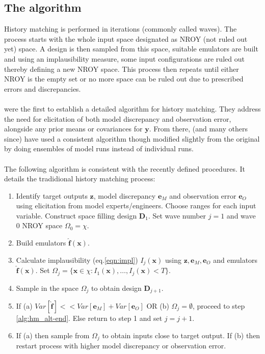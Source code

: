 \documentclass{article}
\newcommand{\emulator}{\hat{f}}
\newcommand{\inputVec}{\mathbf{x}}
\newcommand{\outputVec}{\mathbf{y}}
\newcommand{\design}{\mathbf{D}}
\newcommand{\obsqD}{\mathbf{z}}
\newcommand{\obsErrorqD}{\mathbf{e}_O}
\newcommand{\modelDiscqD}{\mathbf{e}_M}
\newcommand{\paramSpace}{\chi}
\newcommand{\impl}{I}
\newcommand{\NROYspace}{\Omega}
\newcommand{\thresh}{T}
\begin{document}
\subsection{The algorithm}
\label{section:hm-algorithm}
History matching is performed in iterations (commonly called waves). The process starts with the whole input space designated as NROY (not ruled out yet) space. A design is then sampled from this space, suitable emulators are built and using an implausibility measure, some input configurations are ruled out thereby defining a new NROY space. This process then repeats until either NROY is the empty set or no more space can be ruled out due to prescribed errors and discrepancies.\\\\
\citet{Craig1996,Craig1997} were the first to establish a detailed algorithm for history matching. They address the need for elicitation of both model discrepancy and observation error, alongside any prior means or covariances for $\outputVec$. From there, \citet{Vernon2010,Vernon2014,Andrianakis2015} (and many others since) have used a consistent algorithm though modified slightly from the original by doing ensembles of model runs instead of individual runs.\\\\
The following algorithm is consistent with the recently defined procedures. It details the tradidional history matching process:
\begin{enumerate}
    \item \label{section:hm-setup} Identify target outputs $\obsqD$, model discrepancy $\modelDiscqD$ and observation error $\obsErrorqD$ using elicitation from model experts/engineers. Choose ranges for each input variable. Construct space filling design $\design_1$. Set wave number $j=1$ and wave 0 NROY space $\NROYspace_0 = \paramSpace$.

    \item Build emulators $\mathbf{\emulator}(\inputVec)$.

    \item Calculate implausibility (eq.\eqref{eqn:impl}) $\impl_j(\inputVec)$ using $\obsqD,\modelDiscqD,\obsErrorqD$ and emulators $\mathbf{\emulator}(\inputVec)$. Set $\NROYspace_j = \{\inputVec \in \paramSpace:\impl_1(\inputVec),\dots,\impl_j(\inputVec)<\thresh\}$.

    \item \label{section:hm-refocus} Sample in the space $\NROYspace_j$ to obtain design $\design_{j+1}$.

    \item If (a) $Var\left[\mathbf{\emulator}\right]<<Var[\modelDiscqD]+Var[\obsErrorqD]$ OR (b) $\NROYspace_j = \emptyset$, proceed to step \ref{alg:hm_alt-end}. Else return to step 1 and set $j=j+1$.

    \item \label{alg:hm_alt-end} If (a) then sample from $\NROYspace_j$ to obtain inputs close to target output. If (b) then restart process with higher model discrepancy or observation error.
\end{enumerate} 
\end{document}
